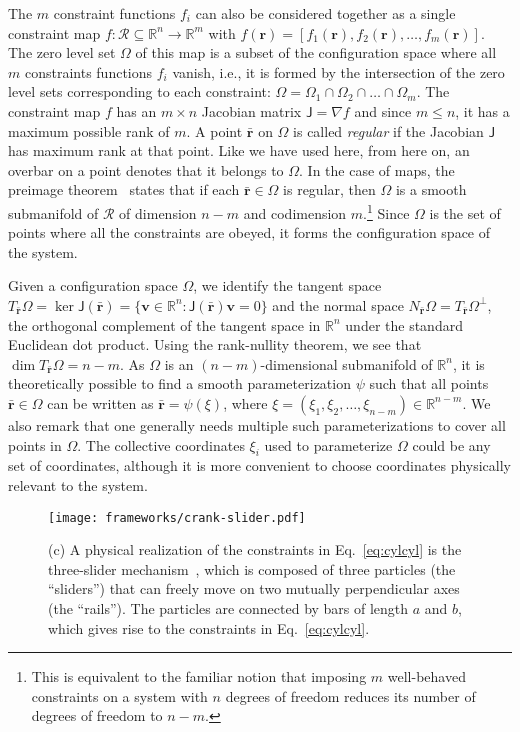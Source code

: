 The $m$ constraint functions $f_i$ can also be considered together as a single constraint map $f: \mathscr{R} \subseteq \mathbb{R}^n \to \mathbb{R}^m$ with $f(\bm{r}) = [f_1(\bm{r}), f_2(\bm{r}), \dots, f_m(\bm{r})]$.
The zero level set $\Omega$ of this map is a subset of the configuration space where all $m$ constraints functions $f_i$ vanish, i.e., it is formed by the intersection of the zero level sets corresponding to each constraint: $\Omega = \Omega_1 \cap \Omega_2 \cap \dots \cap \Omega_m$.
The constraint map $f$ has an $m\times n$ Jacobian matrix $\mathsf{J} = \nabla f$ and since $m\leq n$, it has a maximum possible rank of $m$.
A point $\bar{\bm{r}}$ on $\Omega$ is called \emph{regular} if the Jacobian $\mathsf{J}$ has maximum rank at that point.
Like we have used here, from here on, an overbar on a point denotes that it belongs to $\Omega$.
In the case of maps, the preimage theorem~\cite{lee2013} states that if each $\bar{\bm{r}} \in \Omega$ is regular, then $\Omega$ is a smooth submanifold of $\mathscr{R}$ of dimension $n - m$ and codimension $m$.\footnote{This is equivalent to the familiar notion that imposing $m$ well-behaved constraints on a system with $n$ degrees of freedom reduces its number of degrees of freedom to $n-m$.}
Since $\Omega$ is the set of points where all the constraints are obeyed, it forms the configuration space of the system.

Given a configuration space $\Omega$, we identify the tangent space $T_{\bar{\bm{r}}}\Omega = \ker{\mathsf{J}(\bar{\bm{r}})} = \{\bm{v} \in \mathbb{R}^n: \mathsf{J}(\bar{\bm{r}})\bm{v} = 0\}$ and the normal space $N_{\bar{\bm{r}}}\Omega = T_{\bar{\bm{r}}}\Omega^\perp$, the orthogonal complement of the tangent space in $\mathbb{R}^n$ under the standard Euclidean dot product.
Using the rank-nullity theorem, we see that $\dim T_{\bar{\bm{r}}}\Omega = n-m$.
As $\Omega$ is an $(n-m)$-dimensional submanifold of $\mathbb{R}^n$, it is theoretically possible to find a smooth parameterization $\psi$ such that all points $\bar{\bm{r}} \in \Omega$ can be written as $\bar{\bm{r}} = \psi(\xi)$, where $\xi = (\xi_1, \xi_2, \ldots, \xi_{n-m}) \in \mathbb{R}^{n-m}$.
We also remark that one generally needs multiple such parameterizations to cover all points in $\Omega$.
The collective coordinates $\xi_i$ used to parameterize $\Omega$ could be any set of coordinates, although it is more convenient to choose coordinates physically relevant to the system.
%
\begin{figure}
  \begin{center}
    \texttt{[image: frameworks/crank-slider.pdf]}
  \end{center}
  \caption{(c) A physical realization of the constraints in Eq.~\eqref{eq:cylcyl} is the three-slider mechanism~\cite{bohigas2019}, which is composed of three particles (the ``sliders'') that can freely move on two mutually perpendicular axes (the ``rails'').  
    The particles are connected by bars of length $a$ and $b$, which gives rise to the constraints in Eq.~\eqref{eq:cylcyl}.
  }
  \label{fig:slider}
\end{figure}

